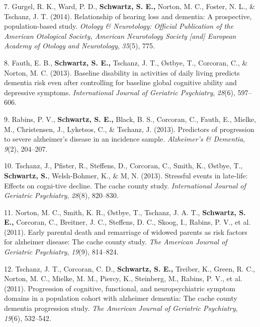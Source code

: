 \documentclass[11pt,a4paper,]{moderncv}
\newlength{\cslhangindent}
\newenvironment{CSLReferences}[2] %
 {\begin{list}{}{%
  \setlength{\itemindent}{0pt}
  \setlength{\leftmargin}{0pt}
  \setlength{\parsep}{0pt}
  \ifodd #1
   \setlength{\leftmargin}{\cslhangindent}
   \setlength{\itemindent}{-1\cslhangindent}
  \fi
  \setlength{\itemsep}{#2\baselineskip}}}
 {\end{list}}
\begin{document}
\begin{CSLReferences}{1}{0}
7. Gurgel, R. K., Ward, P. D., \textbf{Schwartz, S. E.,} Norton, M. C.,
Foster, N. L., \& Tschanz, J. T. (2014). Relationship of hearing loss
and dementia: A prospective, population-based study. \emph{Otology \&
Neurotology: Official Publication of the American Otological Society,
American Neurotology Society {[}and{]} European Academy of Otology and
Neurotology}, \emph{35}(5), 775.

8. Fauth, E. B., \textbf{Schwartz, S. E.,} Tschanz, J. T., Østbye, T.,
Corcoran, C., \& Norton, M. C. (2013). Baseline disability in activities
of daily living predicts dementia risk even after controlling for
baseline global cognitive ability and depressive symptoms.
\emph{International Journal of Geriatric Psychiatry}, \emph{28}(6),
597--606.

9. Rabins, P. V., \textbf{Schwartz, S. E.,} Black, B. S., Corcoran, C.,
Fauth, E., Mielke, M., Christensen, J., Lyketsos, C., \& Tschanz, J.
(2013). Predictors of progression to severe alzheimer's disease in an
incidence sample. \emph{Alzheimer's \& Dementia}, \emph{9}(2), 204--207.

10. Tschanz, J., Pfister, R., Steffens, D., Corcoran, C., Smith, K.,
Østbye, T., \textbf{Schwartz, S.}, Welsh-Bohmer, K., \& M, N. (2013).
Stressful events in late-life: Effects on cogni-tive decline. The cache
county study. \emph{International Journal of Geriatric Psychiatry},
\emph{28}(8), 820--830.

11. Norton, M. C., Smith, K. R., Østbye, T., Tschanz, J. A. T.,
\textbf{Schwartz, S. E.,} Corcoran, C., Breitner, J. C., Steffens, D.
C., Skoog, I., Rabins, P. V., et al. (2011). Early parental death and
remarriage of widowed parents as risk factors for alzheimer disease: The
cache county study. \emph{The American Journal of Geriatric Psychiatry},
\emph{19}(9), 814--824.

12. Tschanz, J. T., Corcoran, C. D., \textbf{Schwartz, S. E.,} Treiber,
K., Green, R. C., Norton, M. C., Mielke, M. M., Piercy, K., Steinberg,
M., Rabins, P. V., et al. (2011). Progression of cognitive, functional,
and neuropsychiatric symptom domains in a population cohort with
alzheimer dementia: The cache county dementia progression study.
\emph{The American Journal of Geriatric Psychiatry}, \emph{19}(6),
532--542.


\end{CSLReferences}
\end{document}
